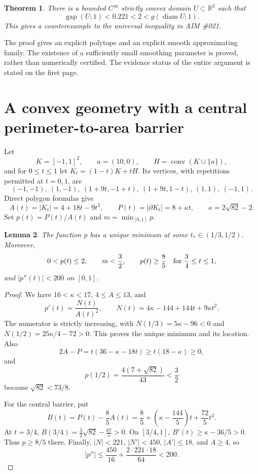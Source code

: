 \documentclass[11pt,a4paper]{article}
\newtheorem{theorem}{Theorem}[section]
\newtheorem{lemma}[theorem]{Lemma}
\theoremstyle{remark}
\newcommand{\R}{\mathbb R}
\newcommand{\gap}{\operatorname{gap}}
\newcommand{\diam}{\operatorname{diam}}
\newcommand{\conv}{\operatorname{conv}}
\begin{document}
\begin{theorem}\label{thm:main}
There is a bounded $C^\infty$ strictly convex domain $U\subset\R^3$ such that
\[
 \gap(U;1)<0.221<2<g(\diam U;1).
\]
This gives a counterexample to the universal inequality in AIM \#021.
\end{theorem}

The proof gives an explicit polytope and an explicit smooth approximating family. The existence of a sufficiently small smoothing parameter is proved, rather than numerically certified. The evidence status of the entire argument is stated on the first page.

\section{A convex geometry with a central perimeter-to-area barrier}
Let
\[
 K=[-1,1]^2,\qquad a=(10,0),\qquad H=\conv(K\cup\{a\}),
\]
and for $0\le t\le1$ let $K_t=(1-t)K+tH$. Its vertices, with repetitions permitted at $t=0,1$, are
\[
 (-1,-1),\ (1,-1),\ (1+9t,-1+t),\ (1+9t,1-t),\ (1,1),\ (-1,1).
\]
Direct polygon formulas give
\begin{equation}\label{eq:AP}
 A(t)=|K_t|=4+18t-9t^2,\qquad
 P(t)=|\partial K_t|=8+\kappa t,\qquad
 \kappa=2\sqrt{82}-2.
\end{equation}
Set $p(t)=P(t)/A(t)$ and $m=\min_{[0,1]}p$.

\begin{lemma}\label{lem:barrier}
The function $p$ has a unique minimum at some $t_*\in(1/3,1/2)$. Moreover,
\[
 0<p(t)\le2,\qquad m<\frac32,\qquad
 p(t)\ge\frac85\quad\hbox{for }\frac34\le t\le1,
\]
and $|p''(t)|<200$ on $[0,1]$.
\end{lemma}
\begin{proof}
We have $16<\kappa<17$, $4\le A\le13$, and
\[
 p'(t)=\frac{N(t)}{A(t)^2},\qquad
 N(t)=4\kappa-144+144t+9\kappa t^2.
\]
The numerator is strictly increasing, with $N(1/3)=5\kappa-96<0$ and $N(1/2)=25\kappa/4-72>0$. This proves the unique minimum and its location. Also
\[
 2A-P=t(36-\kappa-18t)\ge t(18-\kappa)\ge0,
\]
and
\[
 p(1/2)=\frac{4(7+\sqrt{82})}{43}<\frac32
\]
because $\sqrt{82}<73/8$.

For the central barrier, put
\[
 B(t)=P(t)-\frac85A(t)
 =\frac85+\left(\kappa-\frac{144}{5}\right)t+\frac{72}{5}t^2.
\]
At $t=3/4$, $B(3/4)=\tfrac32\sqrt{82}-\tfrac{67}{5}>0$. On $[3/4,1]$,
$B'(t)\ge\kappa-36/5>0$. Thus $p\ge8/5$ there.
Finally, $|N|<221$, $|N'|<450$, $|A'|\le18$, and $A\ge4$, so
\[
 |p''|\le\frac{450}{16}+\frac{2\cdot221\cdot18}{64}<200.
\]
\end{proof}
\end{document}
